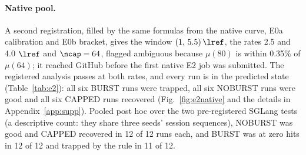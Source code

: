 \paragraph{Native pool.}\label{sec:e2native}
A second registration, filled by the same formulas from the native curve, E0a calibration and E0b bracket, gives the window $(1,\,5.5)\,\lref$, the rates 2.5 and 4.0 $\lref$ and $\ncap=64$, flagged ambiguous because $\mu(80)$ is within 0.35\% of $\mu(64)$; it reached GitHub before the first native E2 job was submitted. The registered analysis passes at both rates, and every run is in the predicted state (Table~\ref{tab:e2}): all six BURST runs were trapped, all six NOBURST runs were good and all six CAPPED runs recovered (Fig.~\ref{fig:e2native} and the details in Appendix~\ref{app:supp}). Pooled post hoc over the two pre-registered SGLang tests (a descriptive count: they share three seeds' session sequences), NOBURST was good and CAPPED recovered in 12 of 12 runs each, and BURST was at zero hits in 12 of 12 and trapped by the rule in 11 of 12.

